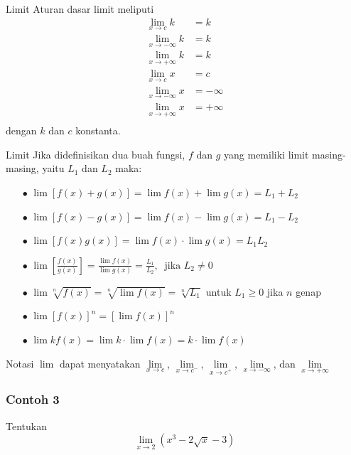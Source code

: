 \documentclass[pdflatex,compress,mathserif]{beamer}
\begin{document}
		\begin{frame}{Limit}
			Aturan dasar limit meliputi
			\begin{align*}
				\lim\limits_{x \rightarrow c} k &= k \\
				\lim\limits_{x \rightarrow - \infty} k &= k \\
				\lim\limits_{x \rightarrow + \infty} k &= k \\
				\lim\limits_{x \rightarrow c} x &= c \\
				\lim\limits_{x \rightarrow - \infty} x &= - \infty \\
				\lim\limits_{x \rightarrow + \infty} x &= + \infty \\
			\end{align*}
			dengan $ k $ dan $ c $ konstanta.
		\end{frame}
	
		\begin{frame}{Limit}
			Jika didefinisikan dua buah fungsi, $ f $ dan $ g $ yang memiliki limit masing-masing, yaitu $ L_1 $ dan $ L_2 $ maka:
			\begin{itemize}
				\item[$\bullet$] $ \lim[f(x) + g(x)] = \lim f(x) + \lim g(x) = L_1 + L_2 $
				\item[$\bullet$] $ \lim[f(x) - g(x)] = \lim f(x) - \lim g(x) = L_1 - L_2 $
				\item[$\bullet$] $ \lim[f(x)g(x)] = \lim f(x) \cdot \lim g(x) = L_1L_2 $
				\item[$\bullet$] $ \lim\left[\frac{f(x)}{g(x)}\right] = \frac{\lim f(x)}{\lim g(x)} = \frac{L_1}{L_2},~\text{ jika } L_2 \neq 0 $
				\item[$\bullet$] $ \lim \sqrt[n]{f(x)} = \sqrt[n]{\lim f(x)} = \sqrt[n]{ L_1 }$ untuk $ L_1 \geq 0 $ jika $ n $ genap
				\item[$\bullet$] $ \lim \left[ f(x) \right] ^n = \left[ \lim f(x) \right]^n $
				\item[$\bullet$] $ \lim k f(x) = \lim k \cdot \lim f(x) = k \cdot \lim f(x) $
			\end{itemize}
			Notasi $ \lim $ dapat menyatakan $ \lim\limits_{x \rightarrow c} $, $ \lim\limits_{x \rightarrow c^-} $, $ \lim\limits_{x \rightarrow c^+} $, $ \lim\limits_{x \rightarrow - \infty} $, dan $ \lim\limits_{x \rightarrow + \infty} $
		\end{frame}
	
		\begin{frame}
			\frametitle{Contoh 3}
			Tentukan
			\begin{equation*}
				\lim\limits_{x \rightarrow 2} \left( x^3 - 2\sqrt{x} - 3 \right)
			\end{equation*}
		\end{frame}
\end{document}
